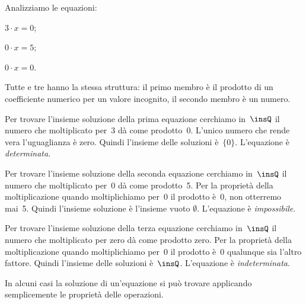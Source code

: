 \begin{exrig}
 \begin{esempio}
 Analizziamo le equazioni:
\begin{multicols}{3}
 \begin{enumeratea}
 \item $3\cdot x=0$;
 \item $0\cdot x=5$;
 \item $0\cdot x=0$.
\end{enumeratea}
\end{multicols}

Tutte e tre hanno la stessa struttura: il primo membro è il prodotto
di un coefficiente numerico per un valore incognito, il secondo membro
è un numero.

\begin{enumeratea}
 \item Per trovare l'insieme soluzione della prima equazione cerchiamo in~$\insQ$ il
numero che moltiplicato per~3 dà come prodotto~0. L'unico numero che rende vera
l'uguaglianza è zero. Quindi l'insieme delle soluzioni è~$\{0\}$. L'equazione è
\emph{determinata}.

 \item Per trovare l'insieme soluzione della seconda equazione cerchiamo in~$\insQ$ il
numero che moltiplicato per~0 dà come prodotto~5. Per la proprietà
della moltiplicazione quando moltiplichiamo per~0 il prodotto è~0,
non otterremo mai~5. Quindi l'insieme soluzione è
l'insieme vuoto $\emptyset$. L'equazione è
\emph{impossibile}.

 \item Per trovare l'insieme soluzione della terza equazione cerchiamo in~$\insQ$ il
numero che moltiplicato per zero dà come prodotto zero. Per la
proprietà della moltiplicazione quando moltiplichiamo per~0 il
prodotto è~0 qualunque sia l'altro fattore. Quindi
l'insieme delle soluzioni è~$\insQ$. L'equazione è
\emph{indeterminata}.
\end{enumeratea}
 \end{esempio}
\end{exrig}

In alcuni casi la soluzione di un'equazione si può
trovare applicando semplicemente le proprietà delle operazioni.

